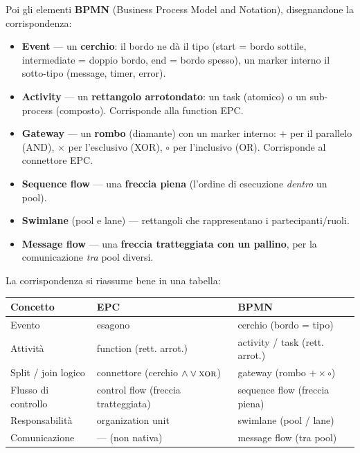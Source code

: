 Poi gli elementi \textbf{BPMN} (Business Process Model and Notation), disegnandone la corrispondenza:
\begin{itemize}
  \item \textbf{Event} — un \textbf{cerchio}: il bordo ne dà il tipo (start = bordo sottile, intermediate = doppio bordo, end = bordo spesso), un marker interno il sotto-tipo (message, timer, error).
  \item \textbf{Activity} — un \textbf{rettangolo arrotondato}: un task (atomico) o un sub-process (composto). Corrisponde alla function EPC.
  \item \textbf{Gateway} — un \textbf{rombo} (diamante) con un marker interno: $+$ per il parallelo (AND), $\times$ per l'esclusivo (XOR), $\circ$ per l'inclusivo (OR). Corrisponde al connettore EPC.
  \item \textbf{Sequence flow} — una \textbf{freccia piena} (l'ordine di esecuzione \emph{dentro} un pool).
  \item \textbf{Swimlane} (pool e lane) — rettangoli che rappresentano i partecipanti/ruoli.
  \item \textbf{Message flow} — una \textbf{freccia tratteggiata con un pallino}, per la comunicazione \emph{tra} pool diversi.
\end{itemize}

La corrispondenza si riassume bene in una tabella:

\begin{center}
\begingroup\small
\begin{tabularx}{\linewidth}{>{\raggedright\arraybackslash}X >{\raggedright\arraybackslash}X >{\raggedright\arraybackslash}X}
\toprule
\textbf{Concetto} & \textbf{EPC} & \textbf{BPMN} \\
\midrule
Evento & esagono & cerchio (bordo = tipo) \\
Attività & function (rett. arrot.) & activity / task (rett. arrot.) \\
Split / join logico & connettore (cerchio $\wedge\vee\textsc{xor}$) & gateway (rombo $+ \times \circ$) \\
Flusso di controllo & control flow (freccia tratteggiata) & sequence flow (freccia piena) \\
Responsabilità & organization unit & swimlane (pool / lane) \\
Comunicazione & --- (non nativa) & message flow (tra pool) \\
\bottomrule
\end{tabularx}
\endgroup
\end{center}

